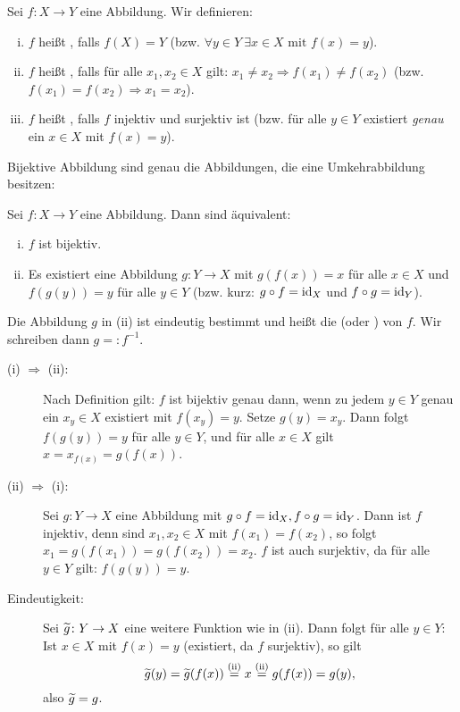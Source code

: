 \begin{definition}
	\label{def:I.2.12}
	Sei $f \colon X \rightarrow Y$ eine Abbildung.
	Wir definieren:
	\begin{enumerate}[(i)]
		\item $f$ heißt , falls $f(X) = Y$ (bzw. $\forall y \in Y \ \exists x \in X \text{ mit } f(x) = y$).
		\item $f$ heißt , falls für alle $x_1,x_2 \in X$ gilt: $x_1 \neq x_2 \Rightarrow f(x_1) \neq f(x_2)$ (bzw. $f(x_1) = f(x_2) \Rightarrow x_1 = x_2$).
		\item $f$ heißt , falls $f$ injektiv und surjektiv ist (bzw. für alle $y \in Y$ existiert \textit{genau} ein $x \in X$ mit $f(x) = y$).
	\end{enumerate}
\end{definition}

Bijektive Abbildung sind genau die Abbildungen, die eine Umkehrabbildung besitzen:

\begin{satz}[Umkehrabbildung]
	\label{satz:I.2.13}
	Sei $f \colon X \rightarrow Y$ eine Abbildung.
	Dann sind äquivalent:
	\begin{enumerate}[(i)]
		\item $f$ ist bijektiv.
		\item Es existiert eine Abbildung $g \colon Y \rightarrow X$ mit $g(f(x))=x$ für alle $x \in X$ und $f(g(y)) = y$ für alle $y \in Y$ (bzw. kurz: $g \circ f = \operatorname{id}_X$ und $f \circ g = \operatorname{id}_Y$).
	\end{enumerate}
	Die Abbildung $g$ in (ii) ist eindeutig bestimmt und heißt die  (oder ) von $f$.
	Wir schreiben dann $g =: f^{-1}$.	
\end{satz}

\begin{beweis}
	\begin{description}
		\item[(i) $\Rightarrow$ (ii):] Nach Definition gilt: $f$ ist bijektiv genau dann, wenn zu jedem $y \in Y$ genau ein $x_y \in X$ existiert mit $f(x_y) = y$.
		Setze $g(y) = x_y$.
		Dann folgt $f(g(y)) = y$ für alle $y \in Y$, und für alle $x \in X$ gilt $x = x_{f(x)} = g(f(x))$.
		\item[(ii) $\Rightarrow$ (i):] Sei $g \colon Y \rightarrow X$ eine Abbildung mit $g \circ f = \operatorname{id}_X, f \circ g = \operatorname{id}_Y$.
		Dann ist $f$ injektiv, denn sind $x_1,x_2 \in X$ mit $f(x_1) = f(x_2)$, so folgt $x_1 = g(f(x_1)) = g(f(x_2)) = x_2$.
		$f$ ist auch surjektiv, da für alle $y \in Y$ gilt: $f(g(y))= y$.
		\item[Eindeutigkeit:] Sei $\widetilde{g} \colon Y \rightarrow X$ eine weitere Funktion wie in (ii).
		Dann folgt für alle $y \in Y$:
		Ist $x \in X$ mit $f(x) = y$ (existiert, da $f$ surjektiv), so gilt
		\[
			\widetilde{g}(y) = \widetilde{g}(f(x)) \stackrel{\text{(ii)}}{=} x \stackrel{\text{(ii)}}{=} g(f(x)) = g(y),
		\]
		also $\widetilde{g} = g$.
	\end{description}	
\end{beweis}

